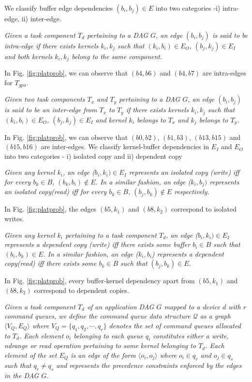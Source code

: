 	We classify buffer edge dependencies $(b_i,b_j) \in E$ into two categories -i) intra-edge, ii) inter-edge.
	\begin{definition}\emph{
		Given a task component $T_d$ pertaining to a DAG $G$, an edge $(b_i,b_j)$ is said to be intra-edge if there exists kernels $k_i,k_j$ such that $(k_i,b_i) \in E_O$, $(b_j,k_j) \in E_I$ and both kernels $k_i,k_j$ belong to the same component.} 
	\end{definition}
	In Fig. \ref{fig:platprob}, we can observe that $(b4,b6)$ and $(b4,b7)$ are intra-edges for $T_{gpu}$.
	\begin{definition}\emph{
		Given two task components $T_x$ and $T_y$ pertaining to a DAG $G$, an edge $(b_i,b_j)$ is said to be an inter-edge from $T_x$ to $T_y$ if there exists kernels $k_i,k_j$ such that $(k_i,b_i) \in E_O$, $(b_j,k_j) \in E_I$ and kernel $k_i$ belongs to $T_x$ and $k_j$ belongs to $T_y$.}
	\end{definition}
	In Fig. \ref{fig:platprob}, we can observe that $(b0,b2)$, $(b1,b3)$, $(b13,b15)$ and $(b15,b16)$ are inter-edges.
	We classify kernel-buffer dependencies in $E_I$ and $E_O$ into two categories - i) isolated copy and ii) dependent copy
	\begin{definition}\emph{
		Given any kernel $k_i$, an edge ($b_i,k_i)\in E_I$ represents an isolated copy (write) {\em iff} for every $b_k \in B$, $(b_k,b_i) \notin E$.
		In a similar fashion, an edge ($k_i,b_j)$ represents an isolated copy(read) {\em iff} for every $b_k \in B$, $(b_j,b_k) \notin E$ respectively.}
	\end{definition}
	In Fig. \ref{fig:platprob}, the edges $(b5,k_1)$ and $(b8,k_2)$ correspond to isolated writes. 
	\begin{definition}\emph{
		Given any kernel $k_i$ pertaining to a task component $T_d$, an edge ($b_i,k_i)\in E_I$ represents a dependent copy (write) {\em iff} there exists some buffer $b_i \in B$ such that  $(b_i,b_k)\in E$.
		In a similar fashion, an edge ($k_i,b_i$) represents a dependent copy(read) {\em iff} there exists some $b_k \in B$ such that $(b_j,b_k) \in E$.} 
	\end{definition}
	In Fig. \ref{fig:platprob}, every buffer-kernel dependency apart from $(b5,k_1)$ and $(b8,k_2)$ correspond to dependent copies.
	\begin{definition}\emph{
		Given a task component $T_d$ of an application DAG $G$ mapped to a device $d$ with $r$ command queues, we define the command queue data structure $\mathcal{Q}$ as a graph $\langle V_Q, E_Q\rangle$  where $V_Q=\{q_1,q_2,\cdots,q_r\}$ denotes the set of command queues allocated to $T_d$. Each element $o_i$ belonging to each queue $q_i$ constitutes either a \textit{write}, \textit{ndrange} or \textit{read} operation pertaining to some kernel belonging to $T_d$. Each element of the set $E_Q$ is an edge of the form $\langle o_i,o_j \rangle$ where  $o_i \in q_r$ and $o_j \in q_s$ such that  $q_r \neq q_s$ and represents the precedence constraints enforced by the edges in the DAG $G$. }
	\end{definition}
